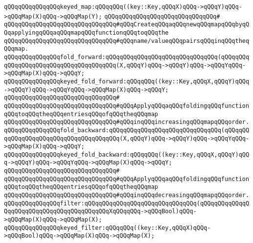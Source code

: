 \verb|qQQqqQQqqQQqqQQqkeyed_map:qQQqqQQq((key::Key,qQQqX)qQQq->qQQqY)qQQq->qQQqMap(X)qQQq->qQQqMap(Y);|\newline
\verb|qQQqqQQqqQQqqQQqqQQqqQQqqQQqqQQq#|\newline
\verb|qQQqqQQqqQQqqQQqqQQqqQQqqQQqqQQq#qQQqCreateqQQqaqQQqnewqQQqmapqQQqbyqQQqapplyingqQQqaqQQqmapqQQqfunctionqQQqtoqQQqthe|\newline
\verb|qQQqqQQqqQQqqQQqqQQqqQQqqQQqqQQq#qQQqname/valueqQQqpairsqQQqinqQQqtheqQQqmap.|\newline
\newline
\verb|qQQqqQQqqQQqqQQqfold_forward:qQQqqQQqqQQqqQQqqQQqqQQqqQQqqQQq(qQQqqQQqqQQqqQQqqQQqqQQqqQQqqQQqqQQqqQQq(X,qQQqY)qQQq->qQQqY)qQQq->qQQqYqQQq->qQQqMap(X)qQQq->qQQqY;|\newline
\verb|qQQqqQQqqQQqqQQqkeyed_fold_forward:qQQqqQQq((key::Key,qQQqX,qQQqY)qQQq->qQQqY)qQQq->qQQqYqQQq->qQQqMap(X)qQQq->qQQqY;|\newline
\verb|qQQqqQQqqQQqqQQqqQQqqQQqqQQqqQQq#|\newline
\verb|qQQqqQQqqQQqqQQqqQQqqQQqqQQqqQQq#qQQqApplyqQQqaqQQqfoldingqQQqfunctionqQQqtoqQQqtheqQQqentriesqQQqofqQQqtheqQQqmap|\newline
\verb|qQQqqQQqqQQqqQQqqQQqqQQqqQQqqQQq#qQQqinqQQqincreasingqQQqmapqQQqorder.|\newline
\newline
\verb|qQQqqQQqqQQqqQQqfold_backward:qQQqqQQqqQQqqQQqqQQqqQQqqQQqqQQq(qQQqqQQqqQQqqQQqqQQqqQQqqQQqqQQqqQQqqQQq(X,qQQqY)qQQq->qQQqY)qQQq->qQQqYqQQq->qQQqMap(X)qQQq->qQQqY;|\newline
\verb|qQQqqQQqqQQqqQQqkeyed_fold_backward:qQQqqQQq((key::Key,qQQqX,qQQqY)qQQq->qQQqY)qQQq->qQQqYqQQq->qQQqMap(X)qQQq->qQQqY;|\newline
\verb|qQQqqQQqqQQqqQQqqQQqqQQqqQQqqQQq#|\newline
\verb|qQQqqQQqqQQqqQQqqQQqqQQqqQQqqQQq#qQQqApplyqQQqaqQQqfoldingqQQqfunctionqQQqtoqQQqtheqQQqentriesqQQqofqQQqtheqQQqmap|\newline
\verb|qQQqqQQqqQQqqQQqqQQqqQQqqQQqqQQq#qQQqinqQQqdecreasingqQQqmapqQQqorder.|\newline
\newline
\verb|qQQqqQQqqQQqqQQqfilter:qQQqqQQqqQQqqQQqqQQqqQQqqQQqqQQq(qQQqqQQqqQQqqQQqqQQqqQQqqQQqqQQqqQQqqQQqqQQqXqQQqqQQq->qQQqBool)qQQq->qQQqMap(X)qQQq->qQQqMap(X);|\newline
\verb|qQQqqQQqqQQqqQQqkeyed_filter:qQQqqQQq((key::Key,qQQqX)qQQq->qQQqBool)qQQq->qQQqMap(X)qQQq->qQQqMap(X);|\newline
